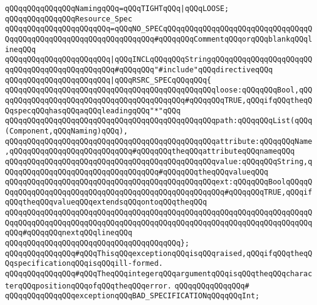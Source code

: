 \newline
\verb|qQQqqQQqqQQqqQQqNamingqQQq=qQQqTIGHTqQQq|\verb#|qQQqLOOSE;#\newline
\newline
\verb|qQQqqQQqqQQqqQQqResource_Spec|\newline
\verb|qQQqqQQqqQQqqQQqqQQqqQQq=qQQqNO_SPECqQQqqQQqqQQqqQQqqQQqqQQqqQQqqQQqqQQqqQQqqQQqqQQqqQQqqQQqqQQqqQQqqQQq#qQQqqQQqCommentqQQqorqQQqblankqQQqlineqQQq|\newline
\verb|qQQqqQQqqQQqqQQqqQQqqQQq|\verb#|qQQqINCLqQQqqQQqStringqQQqqQQqqQQqqQQqqQQqqQQqqQQqqQQqqQQqqQQqqQQqqQQq#\verb|#qQQqqQQq"#include"qQQqdirectiveqQQq|\newline
\verb|qQQqqQQqqQQqqQQqqQQqqQQq|\verb#|qQQqRSRC_SPECqQQqqQQq{#\newline
\verb|qQQqqQQqqQQqqQQqqQQqqQQqqQQqqQQqqQQqqQQqqQQqqQQqloose:qQQqqQQqBool,qQQqqQQqqQQqqQQqqQQqqQQqqQQqqQQqqQQqqQQqqQQq#qQQqqQQqTRUE,qQQqifqQQqtheqQQqspecqQQqhasqQQqaqQQqleadingqQQq"*"qQQq|\newline
\verb|qQQqqQQqqQQqqQQqqQQqqQQqqQQqqQQqqQQqqQQqqQQqqQQqpath:qQQqqQQqList(qQQq(Component,qQQqNaming)qQQq),|\newline
\verb|qQQqqQQqqQQqqQQqqQQqqQQqqQQqqQQqqQQqqQQqqQQqqQQqattribute:qQQqqQQqName,qQQqqQQqqQQqqQQqqQQqqQQqqQQq#qQQqqQQqtheqQQqattributeqQQqnameqQQq|\newline
\verb|qQQqqQQqqQQqqQQqqQQqqQQqqQQqqQQqqQQqqQQqqQQqqQQqvalue:qQQqqQQqString,qQQqqQQqqQQqqQQqqQQqqQQqqQQqqQQqqQQq#qQQqqQQqtheqQQqvalueqQQq|\newline
\verb|qQQqqQQqqQQqqQQqqQQqqQQqqQQqqQQqqQQqqQQqqQQqqQQqext:qQQqqQQqBoolqQQqqQQqqQQqqQQqqQQqqQQqqQQqqQQqqQQqqQQqqQQqqQQqqQQqqQQq#qQQqqQQqTRUE,qQQqifqQQqtheqQQqvalueqQQqextendsqQQqontoqQQqtheqQQq|\newline
\verb|qQQqqQQqqQQqqQQqqQQqqQQqqQQqqQQqqQQqqQQqqQQqqQQqqQQqqQQqqQQqqQQqqQQqqQQqqQQqqQQqqQQqqQQqqQQqqQQqqQQqqQQqqQQqqQQqqQQqqQQqqQQqqQQqqQQqqQQqqQQqqQQq#qQQqqQQqnextqQQqlineqQQq|\newline
\verb|qQQqqQQqqQQqqQQqqQQqqQQqqQQqqQQqqQQqqQQq};|\newline
\newline
\verb|qQQqqQQqqQQqqQQq#qQQqThisqQQqexceptionqQQqisqQQqraised,qQQqifqQQqtheqQQqspecificationqQQqisqQQqill-formed.|\newline
\verb|qQQqqQQqqQQqqQQq#qQQqTheqQQqintegerqQQqargumentqQQqisqQQqtheqQQqcharacterqQQqpositionqQQqofqQQqtheqQQqerror.|\newline
\verb|qQQqqQQqqQQqqQQq#|\newline
\verb|qQQqqQQqqQQqqQQqexceptionqQQqBAD_SPECIFICATIONqQQqqQQqInt;|\newline
